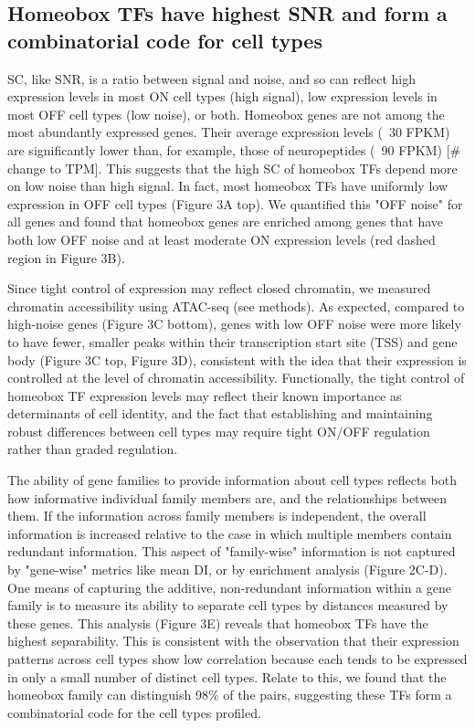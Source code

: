 \subsection{Homeobox TFs have highest SNR and form a combinatorial code for cell types}
SC, like SNR, is a ratio between signal and noise, and so can reflect high expression levels in most ON cell types (high signal), low expression levels in most OFF cell types (low noise), or both. Homeobox genes are not among the most abundantly expressed genes. Their average expression levels (~30 FPKM) are significantly lower than, for example, those of neuropeptides (~90 FPKM) [# change to TPM]. This suggests that the high SC of homeobox TFs depend more on low noise than high signal. In fact, most homeobox TFs have uniformly low expression in OFF cell types (Figure 3A top). We quantified this "OFF noise" for all genes and found that homeobox genes are enriched among genes that have both low OFF noise and at least moderate ON expression levels (red dashed region in Figure 3B).

Since tight control of expression may reflect closed chromatin, we measured chromatin accessibility using ATAC-seq (see methods). As expected, compared to high-noise genes (Figure 3C bottom), genes with low OFF noise were more likely to have fewer, smaller peaks within their transcription start site (TSS) and gene body (Figure 3C top, Figure 3D), consistent with the idea that their expression is controlled at the level of chromatin accessibility. Functionally, the tight control of homeobox TF expression levels may reflect their known importance as determinants of cell identity, and the fact that establishing and maintaining robust differences between cell types may require tight ON/OFF regulation rather than graded regulation.

The ability of gene families to provide information about cell types reflects both how informative individual family members are, and the relationships between them. If the information across family members is independent, the overall information is increased relative to the case in which multiple members contain redundant information. This aspect of "family-wise" information is not captured by "gene-wise" metrics like mean DI, or by enrichment analysis (Figure 2C-D). One means of capturing the additive, non-redundant information within a gene family is to measure its ability to separate cell types by distances measured by these genes. This analysis (Figure 3E) reveals that homeobox TFs have the highest separability. This is consistent with the observation that their expression patterns across cell types show low correlation because each tends to be expressed in only a small number of distinct cell types. Relate to this, we found that the homeobox family can distinguish 98\% of the pairs, suggesting these TFs form a combinatorial code for the cell types profiled. 

